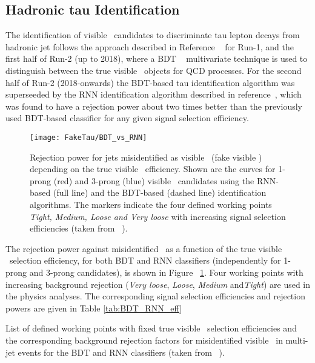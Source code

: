 	\subsection*{Hadronic tau Identification}
The identification of visible \htau\ candidates to discriminate tau lepton decays from hadronic jet follows the approach described in Reference ~\cite{ATL-PHYS-PUB-2015-045} for Run-1, and the first half of Run-2 (up to 2018), where a \ac{BDT} ~\cite{ATL-PHYS-PUB-2015-045} multivariate technique is used to distinguish between the true visible \htau\ objects for QCD processes. For the second half of Run-2 (2018-onwards) the \ac{BDT}-based tau identification algorithm was superseeded by the \ac{RNN} identification algorithm described in reference~\cite{ATL-PHYS-PUB-2019-033}, which was found to have a rejection power about two times better than the previously used \ac{BDT}-based classifier for any given signal selection efficiency. 
\begin{figure}[!htb]
\centering
\texttt{[image: FakeTau/BDT\_vs\_RNN]}
\caption{Rejection power for jets misidentified as visible \htau\ (fake visible \htau) depending on the true visible \htau\
efficiency. Shown are the curves for 1-prong (red) and 3-prong (blue) visible \htau\ candidates using the \ac{RNN}-based (full
line) and the \ac{BDT}-based (dashed line) identification algorithms. The markers indicate the four defined working
points \textit{Tight, Medium, Loose and Very loose} with increasing signal selection efficiencies (taken from ~\cite{ATL-PHYS-PUB-2019-033}).}
\label{fig:BDTvsRNN}
\end{figure}

The rejection power against misidentified \htau\ as a function of the true visible \htau\ selection efficiency, for both \ac{BDT} and \ac{RNN} classifiers (independently for 1-prong and 3-prong candidates), is shown in Figure ~\ref{fig:BDTvsRNN}.
Four working points with increasing background rejection (\textit{Very loose}, \textit{Loose}, \textit{Medium} and\textit{Tight}) are used in the physics analyses. The corresponding signal selection efficiencies and rejection powers are given in Table \ref{tab:BDT_RNN_eff}
\begin{table}[!hbt]
\caption{List of defined working points with fixed true visible \htau\ selection efficiencies and the corresponding background rejection factors for misidentified visible \htau\ in multi-jet events for the \ac{BDT} and \ac{RNN} classifiers (taken from ~\cite{ATL-PHYS-PUB-2019-033}).}\label{tab:BDT_RNN_eff}
	
\end{table}

